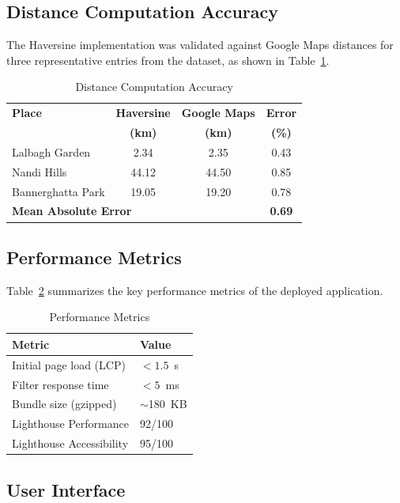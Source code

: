 \documentclass[conference]{IEEEtran}
\begin{document}
\subsection{Distance Computation Accuracy}

The Haversine implementation was validated against Google Maps distances for three representative entries from the dataset, as shown in Table~\ref{tab:distance}.

\begin{table}[htbp]
\caption{Distance Computation Accuracy}
\label{tab:distance}
\centering
\begin{tabular}{lccc}
\toprule
\textbf{Place} & \textbf{Haversine} & \textbf{Google Maps} & \textbf{Error} \\
 & \textbf{(km)} & \textbf{(km)} & \textbf{(\%)} \\
\midrule
Lalbagh Garden & 2.34 & 2.35 & 0.43 \\
Nandi Hills & 44.12 & 44.50 & 0.85 \\
Bannerghatta Park & 19.05 & 19.20 & 0.78 \\
\midrule
\multicolumn{3}{l}{\textbf{Mean Absolute Error}} & \textbf{0.69} \\
\bottomrule
\end{tabular}
\end{table}

\subsection{Performance Metrics}

Table~\ref{tab:performance} summarizes the key performance metrics of the deployed application.

\begin{table}[htbp]
\caption{Performance Metrics}
\label{tab:performance}
\centering
\begin{tabular}{ll}
\toprule
\textbf{Metric} & \textbf{Value} \\
\midrule
Initial page load (LCP) & $<1.5$~s \\
Filter response time & $<5$~ms \\
Bundle size (gzipped) & $\sim$180~KB \\
Lighthouse Performance & 92/100 \\
Lighthouse Accessibility & 95/100 \\
\bottomrule
\end{tabular}
\end{table}

\subsection{User Interface}
\end{document}
